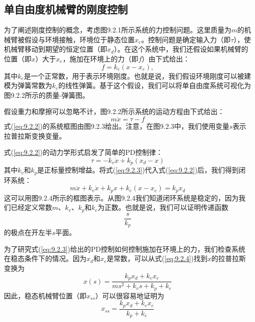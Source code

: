 \documentclass[12pt,a4paper]{ctexart}
\begin{document}
\subsection{单自由度机械臂的刚度控制}

为了阐述刚度控制的概念，考虑图9.2.1所示系统的力控制问题。这里质量为$m$的机械臂被假设与环境接触，环境位于静态位置$x_e$。控制问题是确定输入力（即$\tau$），使机械臂移动到期望的恒定位置（即$x_d$）。在这个系统中，我们还假设如果机械臂的位置（即$x$）大于$x_e$，施加在环境上的力（即$f$）由下式给出：
\begin{equation}\label{eq:9.2.1}
f = k_e(x - x_e),
\end{equation}
其中$k_e$是一个正常数，用于表示环境刚度。也就是说，我们假设环境刚度可以被建模为弹簧常数为$k_e$的线性弹簧。基于这个假设，我们可以将单自由度系统可视化为图9.2.2所示的质量-弹簧图。

假设重力和摩擦可以忽略不计，图9.2.2所示系统的运动方程由下式给出：
\begin{equation}\label{eq:9.2.2}
m\ddot{x} = \tau - f
\end{equation}
式(\ref{eq:9.2.2})的系统框图由图9.2.3给出。注意，在图9.2.3中，我们使用变量$s$表示拉普拉斯变换变量。

式(\ref{eq:9.2.2})的动力学形式启发了简单的PD控制律：
\begin{equation}\label{eq:9.2.3}
\tau = -k_v\dot{x} + k_p(x_d - x)
\end{equation}
其中$k_v$和$k_p$是正标量控制增益。将式(\ref{eq:9.2.3})代入式(\ref{eq:9.2.2})后，我们得到闭环系统：
\begin{equation}\label{eq:9.2.4}
m\ddot{x} + k_v\dot{x} + k_p x + k_e(x - x_e) = k_p x_d
\end{equation}
这可以用图9.2.4所示的框图表示。从图9.2.4我们知道闭环系统是稳定的，因为我们已经定义常数$m$、$k_v$、$k_p$和$k_e$为正数。也就是说，我们可以证明传递函数
\[
\frac{s}{k_p}
\]
的极点在开左半$s$平面。

为了研究式(\ref{eq:9.2.3})给出的PD控制如何控制施加在环境上的力，我们检查系统在稳态条件下的情况。因为$x_d$和$x_e$是常数，可以从式(\ref{eq:9.2.4})找到$x$的拉普拉斯变换为
\begin{equation}\label{eq:9.2.5}
x(s) = \frac{k_p x_d + k_e x_e}{ms^2 + k_v s + k_p + k_e}
\end{equation}
因此，稳态机械臂位置（即$x_{ss}$）可以很容易地证明为
\begin{equation}\label{eq:9.2.6}
x_{ss} = \frac{k_p x_d + k_e x_e}{k_p + k_e}
\end{equation}
\end{document}
